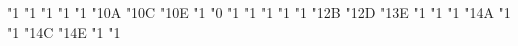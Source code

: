 \mathchardef \bignplus   "1
\mathchardef \bigsqcupplus   "1
\mathchardef \bigsqcapplus   "1
\mathchardef \bigsqcap   "1
\mathchardef \oiintop   "1
\mathchardef \ointctrclockwiseop   "1\txexafam 0A
\mathchardef \ointclockwiseop   "1\txexafam 0C
\mathchardef \sqintop   "1\txexafam 0E
\mathchardef \varprod   "1
\mathchardef \braacext   "0
\mathchardef \iintop   "1
\mathchardef \iiintop   "1
\mathchardef \iiiintop   "1
\mathchardef \idotsintop   "1
\mathchardef \oiiintop   "1
\mathchardef \varointctrclockwiseop   "1\txexafam 2B
\mathchardef \varointclockwiseop   "1\txexafam 2D
\mathchardef \fintop   "1\txexafam 3E
\mathchardef \oiintctrclockwiseop   "1
\mathchardef \varoiintclockwiseop   "1
\mathchardef \oiintclockwiseop   "1
\mathchardef \varoiintctrclockwiseop   "1\txexafam 4A
\mathchardef \oiiintctrclockwiseop   "1
\mathchardef \varoiiintclockwiseop   "1
\mathchardef \oiiintclockwiseop   "1\txexafam 4C
\mathchardef \varoiiintctrclockwiseop   "1\txexafam 4E
\mathchardef \sqiintop   "1
\mathchardef \sqiiintop   "1

   \def\oiint{\oiintop\nolimits}
   \def\ointctrclockwise{\ointctrclockwiseop\nolimits}
   \def\ointclockwise{\ointclockwiseop\nolimits}
   \def\iint{\iintop\nolimits}
   \def\iiint{\iiintop\nolimits}
   \def\sqint{\sqintop\nolimits}
   \def\iiiint{\iiiintop\nolimits}
   \def\oiiint{\oiiintop\nolimits}
   \def\idotsint{\idotsintop\nolimits}
   \def\varointctrclockwise{\varointctrclockwiseop\nolimits}
   \def\varointclockwise{\varointclockwiseop\nolimits}
   \def\fint{\fintop\nolimits}
   \def\oiintctrclockwise{\oiintctrclockwiseop\nolimits}
   \def\varoiintclockwise{\varoiintclockwiseop\nolimits}
   \def\oiintclockwise{\oiintclockwiseop\nolimits}
   \def\varoiintctrclockwise{\varoiintctrclockwiseop\nolimits}
   \def\oiiintctrclockwise{\oiiintctrclockwiseop\nolimits}
   \def\varoiiintclockwise{\varoiiintclockwiseop\nolimits}
   \def\oiiintclockwise{\oiiintclockwiseop\nolimits}
   \def\varoiiintctrclockwise{\varoiiintctrclockwiseop\nolimits}
   \def\sqiint{\sqiintop\nolimits}
   \def\sqiiint{\sqiiintop\nolimits}


